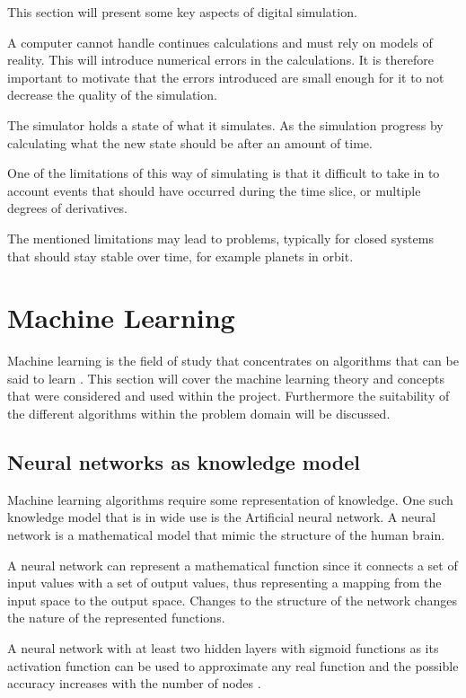 This section will present some key aspects of digital simulation. 

A computer cannot handle continues calculations and must rely on models of reality. This will introduce numerical errors in the calculations. It is therefore important to motivate that the errors introduced are small enough for it to not decrease the quality of the simulation.

The simulator holds a state of what it simulates. As the simulation progress by calculating what the new state should be after an amount of time. 

One of the limitations of this way of simulating is that it difficult to take in to account events that should have occurred during the time slice, or multiple degrees of derivatives. 

The mentioned limitations may lead to problems, typically for closed systems that should stay stable over time, for example planets in orbit. 

\section{Machine Learning}
Machine learning is the field of study that concentrates on algorithms that can be said to learn \cite{glossary}. This section will cover the machine learning theory and concepts that were considered and used within the project. Furthermore the suitability of the different algorithms within the problem domain will be discussed.  

\subsection{Neural networks as knowledge model}
Machine learning algorithms require some representation of knowledge. One such knowledge model that is in wide use is the Artificial neural network. A neural network is a mathematical model that mimic the structure of the human brain. 

A neural network can represent a mathematical function since it connects a set of input values with a set of output values, thus representing a mapping from the input space to the output space. Changes to the structure of the network changes the nature of the represented functions. 

A neural network with at least two hidden layers with sigmoid functions as its activation function can be used to approximate any real function and the possible accuracy increases with the number of nodes \cite{mitchel:approximation}.

